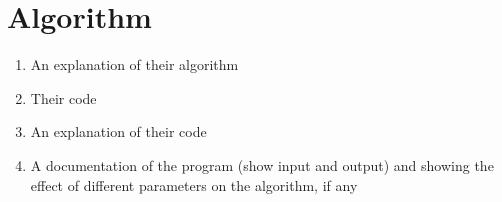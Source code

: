 \chapter{Algorithm}
	\begin{enumerate}
		\item An explanation of their algorithm
		\item Their code
		\item An explanation of their code
		\item A documentation of the program (show input and output) and showing the effect of different parameters on the algorithm, if any
	\end{enumerate}